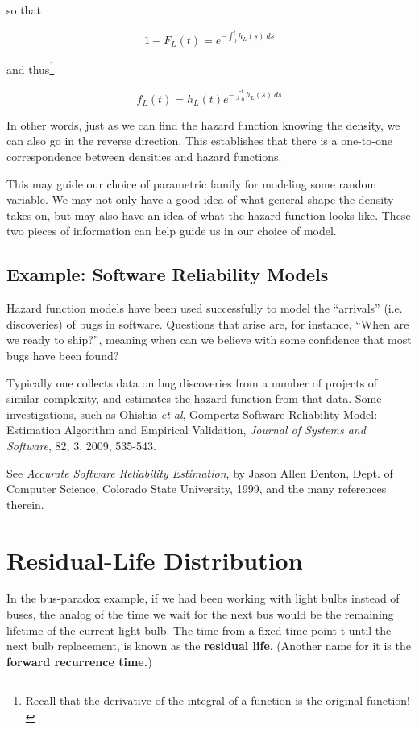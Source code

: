 so that

\begin{equation}
1 - F_L(t) = e^{-\int_{0}^{t} h_L(s) ~ ds}
\end{equation}

and thus\footnote{Recall that the derivative of the integral of a
function is the original function!}

\begin{equation}
f_L(t) = h_L(t) e^{-\int_{0}^{t} h_L(s) ~ ds}
\end{equation}

In other words, just as we can find the hazard function knowing the
density, we can also go in the reverse direction.  This establishes that
there is a one-to-one correspondence between densities and hazard
functions.

This may guide our choice of parametric family for modeling some random
variable.  We may not only have a good idea of what general shape the
density takes on, but may also have an idea of what the hazard function
looks like.  These two pieces of information can help guide us in our
choice of model.

\subsection{Example:  Software Reliability Models}

Hazard function models have been used successfully to model the
``arrivals'' (i.e. discoveries) of bugs in software.  Questions that
arise are, for instance, ``When are we ready to ship?'', meaning when
can we believe with some confidence that most bugs have been found?

Typically one collects data on bug discoveries from a number of projects
of similar complexity, and estimates the hazard function from that data.
Some investigations, such as Ohishia {\it et al}, Gompertz Software
Reliability Model: Estimation Algorithm and Empirical Validation, {\it
Journal of Systems and Software}, 82, 3, 2009, 535-543.

See {\it Accurate Software Reliability Estimation}, by Jason Allen
Denton, Dept. of Computer Science, Colorado State University, 1999, and
the many references therein.

\section{Residual-Life Distribution}
\label{reslife}

In the bus-paradox example, if we had been working with light bulbs
instead of buses, the analog of the time we wait for the next bus would
be the remaining lifetime of the current light bulb. The time from a
fixed time point t until the next bulb replacement, is known as the
\textbf{residual life}.  (Another name for it is the \textbf{forward
recurrence time.}) 

